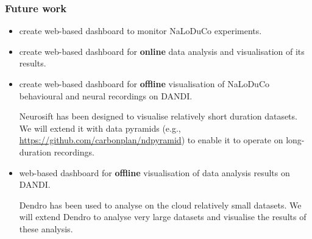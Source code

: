 \begin{frame}
    \frametitle{Future work}

    \begin{itemize}

        \item create web-based dashboard to monitor NaLoDuCo experiments.

        \item create web-based dashboard for \textbf{online} data analysis and
        visualisation of its results.

        \item create web-based dashboard for \textbf{offline} visualisation of NaLoDuCo
        behavioural and neural recordings on DANDI.

        Neurosift has been designed to visualise relatively short duration
        datasets. We will extend it with data pyramids (e.g.,
        \url{https://github.com/carbonplan/ndpyramid}) to enable it to operate on
        long-duration recordings.

        \item web-based dashboard for \textbf{offline} visualisation of data analysis
        results on DANDI.

        Dendro has been used to analyse on the cloud relatively small datasets. We
        will extend Dendro to analyse very large datasets and visualise the results
        of these analysis.

    \end{itemize}

\end{frame}
